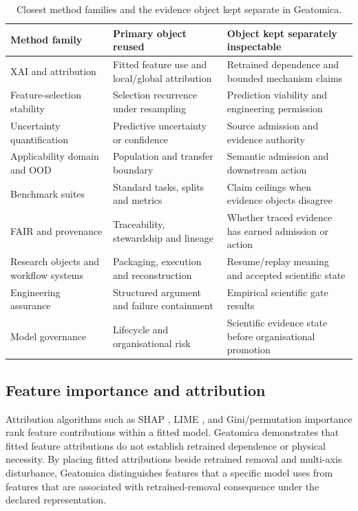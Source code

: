 \documentclass[11pt,a4paper,oneside]{report}
\begin{document}
\begin{table}[H]
\centering
\scriptsize
\caption{Closest method families and the evidence object kept separate in Geatomica.}
\label{tab:closest-methods}
\begin{tabularx}{\textwidth}{L{0.20\textwidth}YY}
\toprule
\textbf{Method family} & \textbf{Primary object reused} & \textbf{Object kept separately inspectable} \\
\midrule
XAI and attribution & Fitted feature use and local/global attribution & Retrained dependence and bounded mechanism claims \\
Feature-selection stability & Selection recurrence under resampling & Prediction viability and engineering permission \\
Uncertainty quantification & Predictive uncertainty or confidence & Source admission and evidence authority \\
Applicability domain and OOD & Population and transfer boundary & Semantic admission and downstream action \\
Benchmark suites & Standard tasks, splits and metrics & Claim ceilings when evidence objects disagree \\
FAIR and provenance \cite{wilkinson2016fair,w3c2013prov} & Traceability, stewardship and lineage & Whether traced evidence has earned admission or action \\
Research objects and workflow systems \cite{soiland2022rocrate,koster2012snakemake,ditommaso2017nextflow} & Packaging, execution and reconstruction & Resume/replay meaning and accepted scientific state \\
Engineering assurance & Structured argument and failure containment & Empirical scientific gate results \\
Model governance \cite{tabassi2023airmf} & Lifecycle and organisational risk & Scientific evidence state before organisational promotion \\
\bottomrule
\end{tabularx}
\end{table}

\subsection{Feature importance and attribution}
Attribution algorithms such as SHAP \cite{lundberg2017unified}, LIME \cite{ribeiro2016why}, and Gini/permutation importance rank feature contributions within a fitted model. Geatomica demonstrates that fitted feature attributions do not establish retrained dependence or physical necessity. By placing fitted attributions beside retrained removal and multi-axis disturbance, Geatomica distinguishes features that a specific model uses from features that are associated with retrained-removal consequence under the declared representation.
\end{document}
